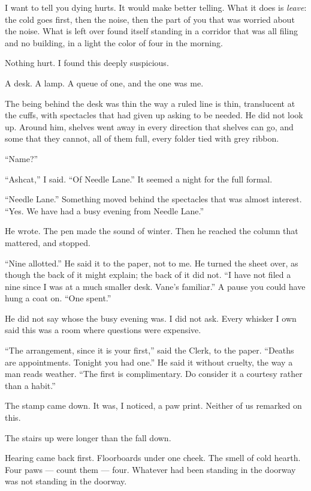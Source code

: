 I want to tell you dying hurts. It would make better telling. What it does is \emph{leave}: the cold goes first, then the noise, then the part of you that was worried about the noise. What is left over found itself standing in a corridor that was all filing and no building, in a light the color of four in the morning.

Nothing hurt. I found this deeply suspicious.

A desk. A lamp. A queue of one, and the one was me.

The being behind the desk was thin the way a ruled line is thin, translucent at the cuffs, with spectacles that had given up asking to be needed. He did not look up. Around him, shelves went away in every direction that shelves can go, and some that they cannot, all of them full, every folder tied with grey ribbon.

``Name?''

``Ashcat,'' I said. ``Of Needle Lane.'' It seemed a night for the full formal.

``Needle Lane.'' Something moved behind the spectacles that was almost interest. ``Yes. We have had a busy evening from Needle Lane.''

He wrote. The pen made the sound of winter. Then he reached the column that mattered, and stopped.

``Nine allotted.'' He said it to the paper, not to me. He turned the sheet over, as though the back of it might explain; the back of it did not. ``I have not filed a nine since I was at a much smaller desk. Vane's familiar.'' A pause you could have hung a coat on. ``One spent.''

He did not say whose the busy evening was. I did not ask. Every whisker I own said this was a room where questions were expensive.

``The arrangement, since it is your first,'' said the Clerk, to the paper. ``Deaths are appointments. Tonight you had one.'' He said it without cruelty, the way a man reads weather. ``The first is complimentary. Do consider it a courtesy rather than a habit.''

The stamp came down. It was, I noticed, a paw print. Neither of us remarked on this.

The stairs up were longer than the fall down.

\scenebreak

Hearing came back first. Floorboards under one cheek. The smell of cold hearth. Four paws --- count them --- four. Whatever had been standing in the doorway was not standing in the doorway.

